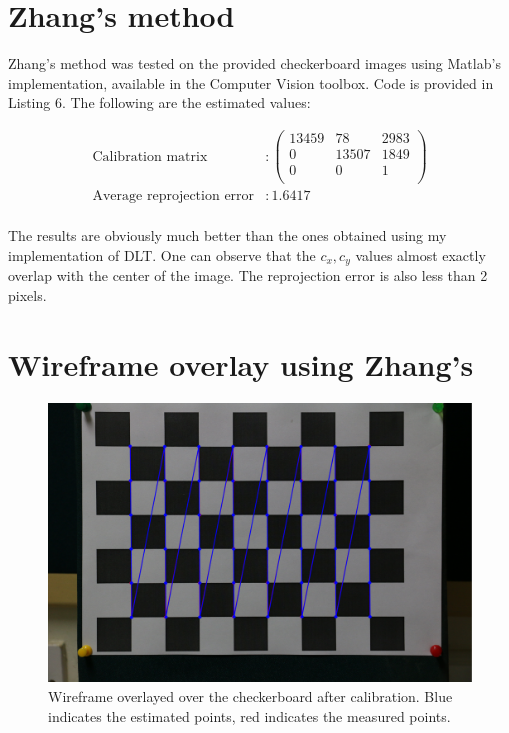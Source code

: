 \documentclass[a4paper,11pt]{article}
\begin{document}
 \section{Zhang's method}
 
 Zhang's method was tested on the provided checkerboard images using Matlab's implementation, available in the Computer Vision toolbox. Code is provided in Listing 6. The following are the estimated values:
 
     \begin{align*}
     \text{Calibration matrix}&:
     \begin{pmatrix}
       13459 & 78 & 2983\\
       0 & 13507 & 1849\\
       0 & 0 & 1\\
     \end{pmatrix}\\
     \text{Average reprojection error}
     &: 1.6417\\
     \end{align*}
     
 The results are obviously much better than the ones obtained using my implementation of DLT. One can observe that the $c_x,c_y$ values almost exactly overlap with the center of the image. The reprojection error is also less than 2 pixels.
     
 \section{Wireframe overlay using Zhang's}
 
     \begin{figure}[H]
      \centering
      \includegraphics[scale=0.2]{checkerboard-overlay}
      \caption{Wireframe overlayed over the checkerboard after calibration. Blue indicates the estimated points, red indicates the measured points.}
    \end{figure}
    
\end{document}
